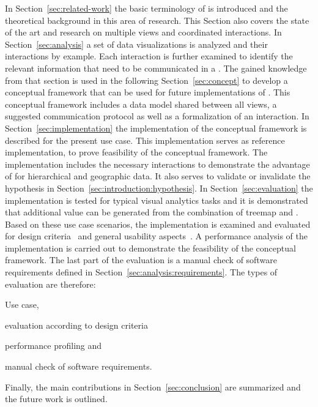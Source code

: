 In Section~\ref{sec:related-work} the basic terminology of \cmvs{} is introduced and the theoretical background in this area of research.
This Section also covers the state of the art and research on multiple views and coordinated interactions.
In Section~\ref{sec:analysis} a set of data visualizations is analyzed and their interactions by example.
Each interaction is further examined to identify the relevant information that need to be communicated in a \cmv{}.
The gained knowledge from that section is used in the following Section~\ref{sec:concept} to develop a conceptual framework that can be used for future implementations of \cmvs{}.
This conceptual framework includes a data model shared between all views, a suggested communication protocol as well as a formalization of an interaction.
In Section~\ref{sec:implementation} the implementation of the conceptual framework is described for the present use case.
This implementation serves as reference implementation, to prove feasibility of the conceptual framework.
The implementation includes the necessary interactions to demonstrate the advantage of \cmvs{} for hierarchical and geographic data.
It also serves to validate or invalidate the hypothesis in Section~\ref{sec:introduction:hypothesis}.
In Section~\ref{sec:evaluation} the implementation is tested for typical visual analytics tasks and it is demonstrated that additional value can be generated from the combination of treemap and \gv{}.
Based on these use case scenarios, the \cmv{} implementation is examined and evaluated for design criteria~\parencite{Baldonado2000} and general usability aspects~\parencite{Roberts2007}.
A performance analysis of the implementation is carried out to demonstrate the feasibility of the conceptual framework.
The last part of the evaluation is a manual check of software requirements defined in Section~\ref{sec:analysis:requirements}.
The types of evaluation are therefore:

\begin{enumerate*}[label=(\arabic*)]
  \item Use case,
  \item evaluation according to design criteria
  \item performance profiling and
  \item manual check of software requirements.
\end{enumerate*}

Finally, the main contributions in Section~\ref{sec:conclusion} are summarized and the future work is outlined.

